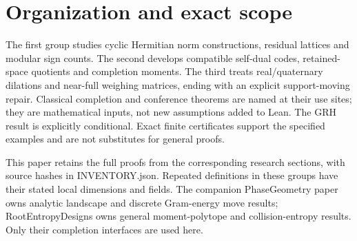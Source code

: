 \documentclass[11pt]{article}
\begin{document}
\begin{abstract}
span-rigidity criterion is proved for actual candidate rows and augmenting
exchanges, including the strict minimum-cost bound and infinite-cost case. The
half-overlap pair-structure barrier and cost-three preservation are also
formalized, using a shared-projection Bessel argument that covers arbitrary
mixed tensor-column candidates. For the explicit $16\times24$ frame,
terminality, the listed three-for-four exchange, and its full order-$24$
completion are formalized. Exact rational reconstruction and exhaustive
kernel-checked sign tests for all $120$ row pairs prove the required
correlation restrictions. Denominators are cleared so that these finite
certificates are checked directly over the integers. They yield the exact exchange cost three for
the base frame and every Hadamard tensor factor, including the explicitly
constructed Sylvester family. The selected comparisons cover 62 of 64 principal claim records; the two
excluded claims are listed below. These results do not establish all-order
Hadamard existence.
\end{abstract}

\tableofcontents
\section*{Organization and exact scope}
The first group studies cyclic Hermitian norm constructions, residual lattices and modular sign counts. The
second develops compatible self-dual codes, retained-space quotients and
completion moments. The third treats real/quaternary dilations and near-full
weighing matrices, ending with an explicit support-moving repair.
Classical completion and conference theorems are named at their use sites;
they are mathematical inputs, not new assumptions added to Lean. The GRH
result is explicitly conditional. Exact finite certificates support the
specified examples and are not substitutes for general proofs.

This paper retains the full proofs from the corresponding research sections,
with source hashes in INVENTORY.json. Repeated definitions in these groups
have their stated local dimensions and fields. The companion PhaseGeometry
paper owns analytic landscape and discrete Gram-energy move results;
RootEntropyDesigns owns general moment-polytope and collision-entropy
results. Only their completion interfaces are used here.
\end{document}
